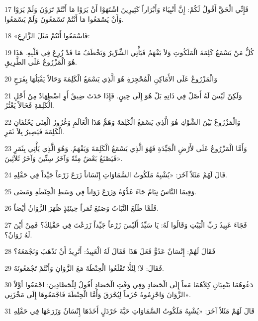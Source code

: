 \par 17 فَإِنِّي الْحَقَّ أَقُولُ لَكُمْ: إِنَّ أَنْبِيَاءَ وَأَبْرَاراً كَثِيرِينَ اشْتَهَوْا أَنْ يَرَوْا مَا أَنْتُمْ تَرَوْنَ وَلَمْ يَرَوْا وَأَنْ يَسْمَعُوا مَا أَنْتُمْ تَسْمَعُونَ وَلَمْ يَسْمَعُوا.
\par 18 «فَاسْمَعُوا أَنْتُمْ مَثَلَ الزَّارِعِ:
\par 19 كُلُّ مَنْ يَسْمَعُ كَلِمَةَ الْمَلَكُوتِ وَلاَ يَفْهَمُ فَيَأْتِي الشِّرِّيرُ وَيَخْطَفُ مَا قَدْ زُرِعَ فِي قَلْبِهِ. هَذَا هُوَ الْمَزْرُوعُ عَلَى الطَّرِيقِ.
\par 20 وَالْمَزْرُوعُ عَلَى الأَمَاكِنِ الْمُحْجِرَةِ هُوَ الَّذِي يَسْمَعُ الْكَلِمَةَ وَحَالاً يَقْبَلُهَا بِفَرَحٍ
\par 21 وَلَكِنْ لَيْسَ لَهُ أَصْلٌ فِي ذَاتِهِ بَلْ هُوَ إِلَى حِينٍ. فَإِذَا حَدَثَ ضِيقٌ أَوِ اضْطِهَادٌ مِنْ أَجْلِ الْكَلِمَةِ فَحَالاً يَعْثُرُ.
\par 22 وَالْمَزْرُوعُ بَيْنَ الشَّوْكِ هُوَ الَّذِي يَسْمَعُ الْكَلِمَةَ وَهَمُّ هَذَا الْعَالَمِ وَغُرُورُ الْغِنَى يَخْنُقَانِ الْكَلِمَةَ فَيَصِيرُ بِلاَ ثَمَرٍ.
\par 23 وَأَمَّا الْمَزْرُوعُ عَلَى لأَرْضِ الْجَيِّدَةِ فَهُوَ الَّذِي يَسْمَعُ الْكَلِمَةَ وَيَفْهَمُ. وَهُوَ الَّذِي يَأْتِي بِثَمَرٍ فَيَصْنَعُ بَعْضٌ مِئَةً وَآخَرُ سِتِّينَ وَآخَرُ ثَلاَثِينَ».
\par 24 قَالَ لَهُمْ مَثَلاً آخَرَ: «يُشْبِهُ مَلَكُوتُ السَّمَاوَاتِ إِنْسَاناً زَرَعَ زَرْعاً جَيِّداً فِي حَقْلِهِ.
\par 25 وَفِيمَا النَّاسُ نِيَامٌ جَاءَ عَدُّوُهُ وَزَرَعَ زَوَاناً فِي وَسَطِ الْحِنْطَةِ وَمَضَى.
\par 26 فَلَمَّا طَلَعَ النَّبَاتُ وَصَنَعَ ثَمَراً حِينَئِذٍ ظَهَرَ الزَّوَانُ أَيْضاً.
\par 27 فَجَاءَ عَبِيدُ رَبِّ الْبَيْتِ وَقَالُوا لَهُ: يَا سَيِّدُ أَلَيْسَ زَرْعاً جَيِّداً زَرَعْتَ فِي حَقْلِكَ؟ فَمِنْ أَيْنَ لَهُ زَوَانٌ؟.
\par 28 فَقَالَ لَهُمْ: إِنْسَانٌ عَدُوٌّ فَعَلَ هَذَا فَقَالَ لَهُ الْعَبِيدُ: أَتُرِيدُ أَنْ نَذْهَبَ وَنَجْمَعَهُ؟
\par 29 فَقَالَ: لاَ! لِئَلَّا تَقْلَعُوا الْحِنْطَةَ مَعَ الزَّوَانِ وَأَنْتُمْ تَجْمَعُونَهُ.
\par 30 دَعُوهُمَا يَنْمِيَانِ كِلاَهُمَا مَعاً إِلَى الْحَصَادِ وَفِي وَقْتِ الْحَصَادِ أَقُولُ لِلْحَصَّادِينَ: اجْمَعُوا أوَّلاً الزَّوَانَ وَاحْزِمُوهُ حُزَماً لِيُحْرَقَ وَأَمَّا الْحِنْطَةَ فَاجْمَعُوهَا إِلَى مَخْزَنِي».
\par 31 قَالَ لَهُمْ مَثَلاً آخَرَ: «يُشْبِهُ مَلَكُوتُ السَّمَاوَاتِ حَبَّةَ خَرْدَلٍ أَخَذَهَا إِنْسَانٌ وَزَرَعَهَا فِي حَقْلِهِ
